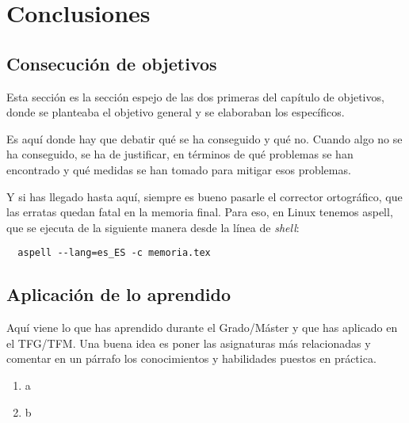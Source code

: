 \documentclass[a4paper, 12pt]{book}
\begin{document}



\cleardoublepage
\chapter{Conclusiones}
\label{chap:conclusiones}


\section{Consecución de objetivos}
\label{sec:consecucion-objetivos}

Esta sección es la sección espejo de las dos primeras del capítulo de objetivos, donde se planteaba el objetivo general y se elaboraban los específicos.

Es aquí donde hay que debatir qué se ha conseguido y qué no. 
Cuando algo no se ha conseguido, se ha de justificar, en términos de qué problemas se han encontrado y qué medidas se han tomado para mitigar esos problemas.

Y si has llegado hasta aquí, siempre es bueno pasarle el corrector ortográfico, que las erratas quedan fatal en la memoria final.
Para eso, en Linux tenemos aspell, que se ejecuta de la siguiente manera desde la línea de \emph{shell}:

\begin{verbatim}
  aspell --lang=es_ES -c memoria.tex
\end{verbatim}

\section{Aplicación de lo aprendido}
\label{sec:aplicacion}

Aquí viene lo que has aprendido durante el Grado/Máster y que has aplicado en el TFG/TFM. Una buena idea es poner las asignaturas más relacionadas y comentar en un párrafo los conocimientos y habilidades puestos en práctica.

\begin{enumerate}
  \item a
  \item b
\end{enumerate}
\end{document}
